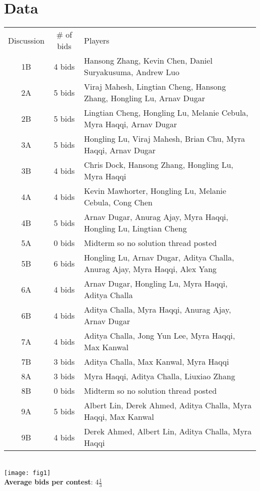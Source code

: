 \documentclass[leqno]{article}
\begin{document}
\section{Data}
\begin{tabular}{c c l}
Discussion & \# of bids & Players\\
1B & 4 bids & Hansong Zhang, Kevin Chen, Daniel Suryakusuma, Andrew Luo\\
2A & 5 bids & Viraj Mahesh, Lingtian Cheng, Hansong Zhang, Hongling Lu, Arnav Dugar\\
2B & 5 bids & Lingtian Cheng, Hongling Lu, Melanie Cebula, Myra Haqqi, Arnav Dugar\\
3A & 5 bids & Hongling Lu, Viraj Mahesh, Brian Chu, Myra Haqqi, Arnav Dugar\\
3B & 4 bids & Chris Dock, Hansong Zhang, Hongling Lu, Myra Haqqi\\
4A & 4 bids & Kevin Mawhorter, Hongling Lu, Melanie Cebula, Cong Chen\\
4B & 5 bids & Arnav Dugar, Anurag Ajay, Myra Haqqi, Hongling Lu, Lingtian Cheng\\
5A & 0 bids & Midterm so no solution thread posted\\
5B & 6 bids & Hongling Lu, Arnav Dugar, Aditya Challa, Anurag Ajay, Myra Haqqi, Alex Yang\\
6A & 4 bids & Arnav Dugar, Hongling Lu, Myra Haqqi, Aditya Challa\\
6B & 4 bids & Aditya Challa, Myra Haqqi, Anurag Ajay, Arnav Dugar\\
7A & 4 bids & Aditya Challa, Jong Yun Lee, Myra Haqqi, Max Kanwal\\
7B & 3 bids & Aditya Challa, Max Kanwal, Myra Haqqi\\
8A & 3 bids & Myra Haqqi, Aditya Challa, Liuxiao Zhang\\
8B & 0 bids & Midterm so no solution thread posted\\
9A & 5 bids & Albert Lin, Derek Ahmed, Aditya Challa, Myra Haqqi, Max Kanwal\\
9B & 4 bids & Derek Ahmed, Albert Lin, Aditya Challa, Myra Haqqi
\end{tabular}\\

\texttt{[image: fig1]}\\

\textbf{Average bids per contest}: $4\frac{1}{3}$\\
\end{document}
